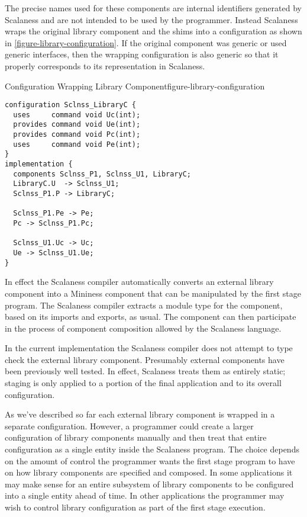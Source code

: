 The precise names used for these components are internal identifiers
generated by Scalaness and are not intended to be used by the
programmer. Instead Scalaness wraps the original library component and
the shims into a configuration as shown in
\autoref{figure-library-configuration}. If the original component was
generic or used generic interfaces, then the wrapping configuration is
also generic so that it properly corresponds to its representation in
Scalaness.

\begin{fpfig}[tbhp]{Configuration Wrapping Library Component}{figure-library-configuration}
{
\begin{Verbatim}[fontsize=\small]
configuration Sclnss_LibraryC {
  uses     command void Uc(int);
  provides command void Ue(int);
  provides command void Pc(int);
  uses     command void Pe(int);
}
implementation {
  components Sclnss_P1, Sclnss_U1, LibraryC;
  LibraryC.U  -> Sclnss_U1;
  Sclnss_P1.P -> LibraryC;

  Sclnss_P1.Pe -> Pe;
  Pc -> Sclnss_P1.Pc;
  
  Sclnss_U1.Uc -> Uc;
  Ue -> Sclnss_U1.Ue;
}
\end{Verbatim}
}
\end{fpfig}

In effect the Scalaness compiler automatically converts an external
library component into a Mininess component that can be manipulated by
the first stage program. The Scalaness compiler extracts a module type
for the component, based on its imports and exports, as usual. The
component can then participate in the process of component composition
allowed by the Scalaness language.

In the current implementation the Scalaness compiler does not attempt
to type check the external library component. Presumably external
components have been previously well tested. In effect, Scalaness
treats them as entirely static; staging is only applied to a portion
of the final application and to its overall configuration.


As we've described so far each external library component is wrapped
in a separate configuration. However, a programmer could create a
larger configuration of library components manually and then treat
that entire configuration as a single entity inside the Scalaness
program. The choice depends on the amount of control the programmer
wants the first stage program to have on how library components are
specified and composed. In some applications it may make sense for an
entire subsystem of library components to be configured into a single
entity ahead of time. In other applications the programmer may wish to
control library configuration as part of the first stage execution.
